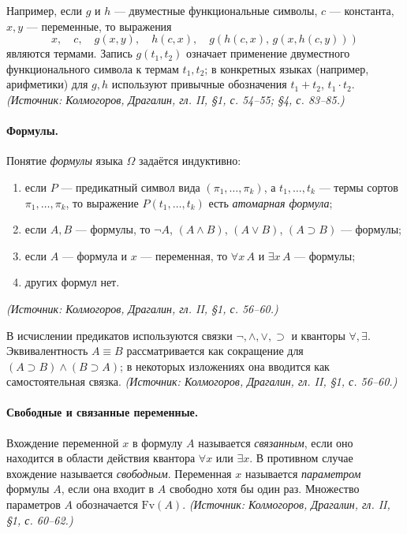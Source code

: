 \documentclass[a4paper,12pt]{article}
\begin{document}
Например, если \(g\) и \(h\) — двуместные функциональные символы, \(c\) — константа, \(x,y\) — переменные, то выражения
\[
x,\quad c,\quad g(x,y),\quad h(c,x),\quad g(h(c,x),\,g(x,h(c,y)))
\]
являются термами. Запись \(g(t_1,t_2)\) означает применение двуместного функционального символа к термам \(t_1,t_2\); в конкретных языках (например, арифметики) для \(g,h\) используют привычные обозначения \(t_1+t_2\), \(t_1\cdot t_2\).
\textit{(Источник: Колмогоров, Драгалин, гл. II, §1, с. 54--55; §4, с. 83--85.)}

\paragraph{Формулы.} Понятие \emph{формулы} языка \(\Omega\) задаётся индуктивно:
\begin{enumerate}[label=\arabic*)]
\item если \(P\) — предикатный символ вида \((\pi_1,\ldots,\pi_k)\), а \(t_1,\ldots,t_k\) — термы сортов \(\pi_1,\ldots,\pi_k\), то выражение \(P(t_1,\ldots,t_k)\) есть \emph{атомарная формула};
\item если \(A,B\) — формулы, то \(\neg A\), \((A\wedge B)\), \((A\vee B)\), \((A\supset B)\) — формулы;
\item если \(A\) — формула и \(x\) — переменная, то \(\forall x\,A\) и \(\exists x\,A\) — формулы;
\item других формул нет.
\end{enumerate}
\textit{(Источник: Колмогоров, Драгалин, гл. II, §1, с. 56--60.)}

В исчислении предикатов используются связки \(\neg,\wedge,\vee,\supset\) и кванторы \(\forall,\exists\). Эквивалентность \(A\equiv B\) рассматривается как сокращение для \((A\supset B)\wedge(B\supset A)\); в некоторых изложениях она вводится как самостоятельная связка.
\textit{(Источник: Колмогоров, Драгалин, гл. II, §1, с. 56--60.)}

\paragraph{Свободные и связанные переменные.} Вхождение переменной \(x\) в формулу \(A\) называется \emph{связанным}, если оно находится в области действия квантора \(\forall x\) или \(\exists x\). В противном случае вхождение называется \emph{свободным}. Переменная \(x\) называется \emph{параметром} формулы \(A\), если она входит в \(A\) свободно хотя бы один раз. Множество параметров \(A\) обозначается \(\mathrm{Fv}(A)\).
\textit{(Источник: Колмогоров, Драгалин, гл. II, §1, с. 60--62.)}
\end{document}
